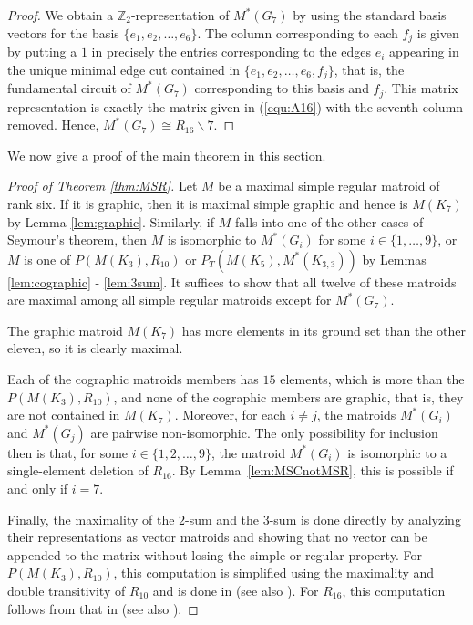 \documentclass[reqno,12pt]{amsart}
\numberwithin{theorem}{section}
\theoremstyle{plain}
\theoremstyle{definition}
\theoremstyle{remark}
\numberwithin{equation}{section}
\numberwithin{table}{section}
\begin{document}
\begin{proof}
We obtain a $\mathbb{Z}_2$-representation of $M^*(G_7)$ by using the standard basis vectors for the basis $\{e_1,e_2,\dots,e_6\}$. The column corresponding to each $f_j$ is given by putting a $1$ in precisely the entries corresponding to the edges $e_i$ appearing in the unique minimal edge cut contained in $\{e_1,e_2,\dots,e_6,f_j\}$, that is, the fundamental circuit of $M^*(G_7)$ corresponding to this basis and $f_j$. This matrix representation is exactly the matrix given in (\ref{equ:A16}) with the seventh column removed. Hence, $M^*(G_7)\cong R_{16} \backslash 7$.
\end{proof}

We now give a proof of the main theorem in this section.
\begin{proof}[Proof of Theorem \ref{thm:MSR}]
Let $M$ be a maximal simple regular matroid of rank six. If it is graphic, then it is maximal simple graphic and hence is $M(K_7)$ by Lemma \ref{lem:graphic}. Similarly, if $M$ falls into one of the other cases of Seymour's theorem, then $M$ is isomorphic to $M^*(G_i)$ for some $i \in \{1, \ldots, 9\}$, or $M$ is one of $P(M(K_3), R_{10})$ or $P_T(M(K_5), M^*(K_{3,3}))$ by Lemmas \ref{lem:cographic} - \ref{lem:3sum}. It suffices to show that all twelve of these matroids are maximal among all simple regular matroids except for $M^*(G_7)$.

The graphic matroid $M(K_7)$ has more elements in its ground set than the other eleven, so it is clearly maximal. 

Each of the cographic matroids members has $15$ elements, which is more than the $P(M(K_3),R_{10})$, and none of the cographic members are graphic, that is, they are not contained in $M(K_7)$. Moreover, for each $i\neq j$, the matroids $M^*(G_i)$ and $M^*(G_j)$ are pairwise non-isomorphic.
The only possibility for inclusion then is that, for some $i\in \{1,2,\ldots,9\}$, the matroid $M^*(G_i)$ is isomorphic to a single-element deletion of $R_{16}$. By Lemma~\ref{lem:MSCnotMSR}, this is possible if and only if $i = 7$. 

Finally, the maximality of the $2$-sum and the $3$-sum is done directly by analyzing their representations as vector matroids and showing that no vector can be appended to the matrix without losing the simple or regular property. For $P(M(K_3),R_{10})$, this computation is simplified using the maximality and double transitivity of $R_{10}$ and is done in \cite[page 328]{Seymour80} (see also \cite[Lemma 83]{Israel-PhD}). For $R_{16}$, this computation follows from that in \cite[Appendix]{Seymour80} (see also \cite[Exercise 3.1.3]{Oxley-book}).
\end{proof}
\end{document}

